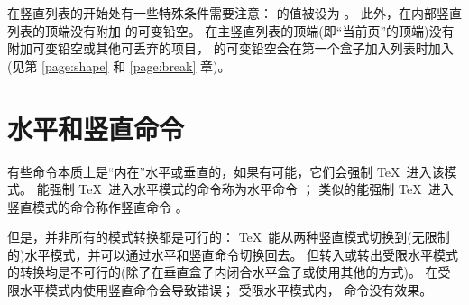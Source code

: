 \documentclass{book}
\begin{document}
在竖直列表的开始处有一些特殊条件需要注意：
 的值被设为 \n{-1000pt}。
此外，在内部竖直列表的顶端没有附加  的可变铅空。
在主竖直列表的顶端(即“当前页”的顶端)没有附加可变铅空或其他可丢弃的项目，
 的可变铅空会在第一个盒子加入列表时加入
(见第 \ref{page:shape} 和 \ref{page:break} 章)。

\section{水平和竖直命令}

有些命令本质上是“内在”水平或垂直的，如果有可能，它们会强制 \TeX\ 进入该模式。
能强制 \TeX\ 进入水平模式的命令称为水平命令 ；
类似的能强制 \TeX\ 进入竖直模式的命令称作竖直命令 。

但是，并非所有的模式转换都是可行的：
\TeX\ 能从两种竖直模式切换到(无限制的)水平模式，并可以通过水平和竖直命令切换回去。
但转入或转出受限水平模式的转换均是不可行的(除了在垂直盒子内闭合水平盒子或使用其他的方式)。
在受限水平模式内使用竖直命令会导致错误；
受限水平模式内， 命令没有效果。
\end{document}
